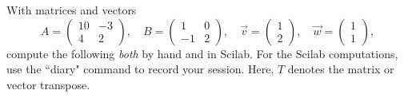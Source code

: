 \documentclass[addpoints, 11pt]{exam}
\newcommand{\ds}{\displaystyle}
\begin{document}
\begin{questions}
\question With matrices and vectors
$$
A = \left(
\begin{array}{rr}
10 & -3 \\
4 & 2
\end{array} \right) , \quad
B = \left(
\begin{array}{rr}
1 & 0 \\
-1 & 2
\end{array} \right) , \quad
\vec{v} = \left(
\begin{array}{r}
1  \\
2
\end{array} \right) , \quad
\vec{w} = \left(
\begin{array}{r}
1  \\
1
\end{array} \right) ,
$$
compute the following \emph{both} by hand and in Scilab. For the Scilab computations, use the ``diary" command to record your session. Here, $T$ denotes the matrix or vector transpose.
\begin{parts}
\end{parts}
\end{questions}
\end{document}
